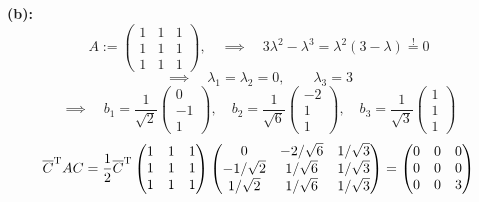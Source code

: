 		\textbf{(b):}
		\[
			A :=
			\begin{pmatrix}
				1 & 1 & 1 \\
				1 & 1 & 1 \\
				1 & 1 & 1
			\end{pmatrix}
			,\quad \implies \quad 3\lambda^2-\lambda^3=\lambda^2(3-\lambda) \stackrel{!}{=}0
		\]
		\[ \implies \quad \lambda_1=\lambda_2=0,\qquad \lambda_3 = 3 \]
		\[
			\implies \quad
			b_1 = \frac{1}{\sqrt{2}}
			\begin{pmatrix}
				0 \\ -1 \\ 1
			\end{pmatrix}
			,\quad
			b_2 = \frac{1}{\sqrt{6}}
			\begin{pmatrix}
				-2 \\ 1 \\ 1
			\end{pmatrix}
			,\quad
			b_3 = \frac{1}{\sqrt{3}}
			\begin{pmatrix}
				1 \\ 1 \\ 1
			\end{pmatrix}
		\]
		\[
			{\overline{C}}^{\mathrm{T}}AC = \frac{1}{2}
			{\overline{C}}^{\mathrm{T}}
			\begin{pmatrix}
				1 & 1 & 1 \\
				1 & 1 & 1 \\
				1 & 1 & 1
			\end{pmatrix}
			\begin{pmatrix}
				0 & -2/\sqrt{6} & 1/\sqrt{3} \\
				-1/\sqrt{2} & 1/\sqrt{6} & 1/\sqrt{3} \\
				1/\sqrt{2} & 1/\sqrt{6} & 1/\sqrt{3}
			\end{pmatrix}
			=
			\begin{pmatrix}
				0 & 0 & 0 \\
				0 & 0 & 0 \\
				0 & 0 & 3 
			\end{pmatrix}
		\]


